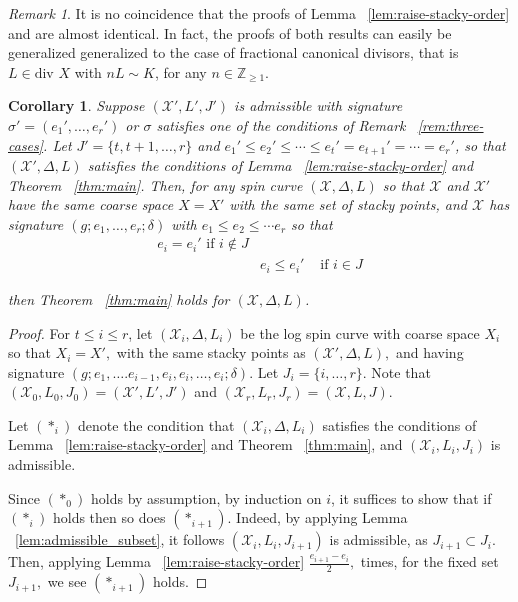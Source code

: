 \documentclass{amsart}
\theoremstyle{plain}
\newtheorem{cor}[thm]{Corollary}
\theoremstyle{definition}
\theoremstyle{remark}
\newtheorem{rem}[thm]{Remark}
\numberwithin{equation}{section}
\newcommand\BZ{{\mathbb Z}}
\newcommand \sx{\mathscr X}
\newcommand \di{\text{div }}
\newcommand \halfcan{L}
\begin{document}
\begin{rem}
\label{rem:raise-fractional-order}
It is no coincidence that the proofs of Lemma ~\ref{lem:raise-stacky-order} and \cite[Theorem 8.5.7]{vzb:stacky} are almost identical. In fact, the proofs of both results can easily be generalized generalized to the case of fractional canonical divisors, that is $L \in \di X$ with $nL \sim K$, for any $n \in \BZ_{\geq 1}$.
\end{rem}



\begin{cor}
\label{cor:raise-stacky-order}
Suppose $(\sx',L',J')$ is admissible with signature $\sigma' = (e_1',\ldots,e_r')$ or $\sigma$ satisfies one of the conditions of Remark ~\ref{rem:three-cases}. Let $J' = \{t,t+1,\ldots,r\}$ and $e_1' \leq e_2' \leq \cdots \leq e_t' = e_{t+1}' =\cdots = e_r'$,
so that $(\sx',\Delta, L)$ satisfies the conditions of Lemma ~\ref{lem:raise-stacky-order} and Theorem ~\ref{thm:main}. Then, for any spin curve $(\sx,\Delta,L)$ so that $\sx$ and $\sx'$ have the same coarse space $X = X'$ with the same set of stacky points, and $\sx$ has signature $(g;e_1,\ldots, e_r;\delta)$ with $e_1 \leq e_2 \leq \cdots e_r$ so that
\begin{align*}
	e_i	= e_i' \text{ if }i \notin J \\
	& e_i \leq e_i' &\text{ if } i \in J
\end{align*}

\noindent
then Theorem ~\ref{thm:main} holds for $(\sx,\Delta,L)$.
\end{cor}
\begin{proof}
For $t \leq i \leq r$, let $(\sx_i,\Delta, L_i)$ be the log spin curve with coarse space $X_i$ so that $X_i = X',$ with the same stacky points as $(\sx',\Delta,L),$ and having signature $(g; e_1, \ldots. e_{i-1}, e_i, e_i, \ldots, e_i; \delta).$ Let 
$J_i = \{i,\ldots, r\}.$ Note that $(\sx_0,L_0,J_0) = (\sx',L',J')$ and $(\sx_r ,L_r ,J_r) = (\sx, L, J)$.

Let $(*_i)$ denote the condition that $(\sx_i,\Delta, L_i)$ satisfies the conditions of Lemma ~\ref{lem:raise-stacky-order} and Theorem ~\ref{thm:main}, and $(\sx_i, \halfcan_i, J_i)$ is admissible.

Since $(*_0)$ holds by assumption, by induction on $i$, it suffices to show that if $(*_i)$ holds then so does $(*_{i+1}).$ 
Indeed, by applying Lemma ~\ref{lem:admissible_subset}, it follows $(\sx_i, \halfcan_i, J_{i+1})$ is admissible, as $J_{i+1} \subset J_i$. Then, applying Lemma ~\ref{lem:raise-stacky-order} $\frac{e_{i+1}-e_i}{2},$ times, for the fixed set $J_{i+1},$ we see $(*_{i+1})$ holds.
\end{proof}
\end{document}
